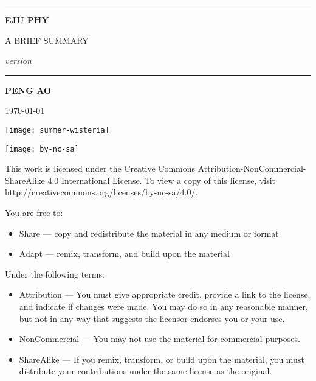 
\begin{titlepage}
    \begin{center}
        \vspace{4cm}
        
        \rule{\textwidth}{1.2pt}
        
        \vspace{0.3cm}

        {\Huge \textbf{EJU PHY}}

        \vspace{0.3cm}

        {\LARGE A BRIEF SUMMARY}

        \vspace{0.3cm}

        {\Large \textit{version \version}}

        \rule{\textwidth}{1.2pt}

        \vspace{2cm}

        {\LARGE \textbf{PENG AO}}

        \vspace{0.5cm}
        {\Large \today}

        \vfill

        \texttt{[image: summer-wisteria]}
    \end{center}
\end{titlepage}


\clearpage
\begin{flushleft}
    \null

    \vfill
    \texttt{[image: by-nc-sa]}

    This work is licensed under the Creative Commons Attribution-NonCommercial-ShareAlike 4.0 International License. To view a copy of this license, visit http://creativecommons.org/licenses/by-nc-sa/4.0/.

    \vspace{1em}
    You are free to:
    \begin{itemize}
        \item Share — copy and redistribute the material in any medium or format
        \item Adapt — remix, transform, and build upon the material
    \end{itemize}

    Under the following terms:
    \begin{itemize}
        \item Attribution — You must give appropriate credit, provide a link to the license, and indicate if changes were made. You may do so in any reasonable manner, but not in any way that suggests the licensor endorses you or your use.
        \item NonCommercial — You may not use the material for commercial purposes.
        \item ShareAlike — If you remix, transform, or build upon the material, you must distribute your contributions under the same license as the original.
    \end{itemize}
\end{flushleft}

